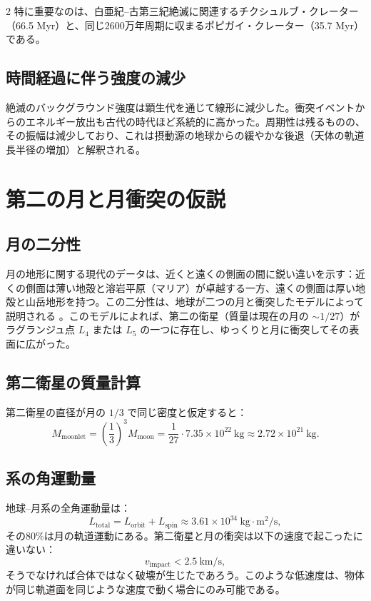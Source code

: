 \documentclass[12pt,a4paper]{article}
\begin{document}
\begin{multicols}{2}
		特に重要なのは、白亜紀–古第三紀絶滅に関連するチクシュルブ・クレーター（66.5 Myr）と、同じ2600万年周期に収まるポピガイ・クレーター（35.7 Myr）である。
		
		\subsection{時間経過に伴う強度の減少}
		絶滅のバックグラウンド強度は顕生代を通じて線形に減少した。衝突イベントからのエネルギー放出も古代の時代ほど系統的に高かった。周期性は残るものの、その振幅は減少しており、これは摂動源の地球からの緩やかな後退（天体の軌道長半径の増加）と解釈される。
		
		\section{第二の月と月衝突の仮説}
		\subsection{月の二分性}
		月の地形に関する現代のデータは、近くと遠くの側面の間に鋭い違いを示す：近くの側面は薄い地殻と溶岩平原（マリア）が卓越する一方、遠くの側面は厚い地殻と山岳地形を持つ。この二分性は、地球が二つの月と衝突したモデルによって説明される \cite{JutziAsphaug2011}。このモデルによれば、第二の衛星（質量は現在の月の \(\sim 1/27\)）がラグランジュ点 \(L_4\) または \(L_5\) の一つに存在し、ゆっくりと月に衝突してその表面に広がった。
		
		\subsection{第二衛星の質量計算}
		第二衛星の直径が月の \(1/3\) で同じ密度と仮定すると：
		{\small
			\[
			M_{\text{moonlet}} = \left(\frac{1}{3}\right)^3 M_{\text{moon}} = \frac{1}{27} \cdot 7.35 \times 10^{22}\ \text{kg} \approx 2.72 \times 10^{21}\ \text{kg}.
			\]}
		
		\subsection{系の角運動量}
		地球–月系の全角運動量は：
		\[
		L_{\text{total}} = L_{\text{orbit}} + L_{\text{spin}} \approx 3.61 \times 10^{34}\ \text{kg}\cdot\text{m}^2/\text{s},
		\]
		その80\%は月の軌道運動にある。第二衛星と月の衝突は以下の速度で起こったに違いない：
		\[
		v_{\text{impact}} < 2.5\ \text{km/s},
		\]
		そうでなければ合体ではなく破壊が生じたであろう。このような低速度は、物体が同じ軌道面を同じような速度で動く場合にのみ可能である。
		

\end{multicols}
\end{document}
